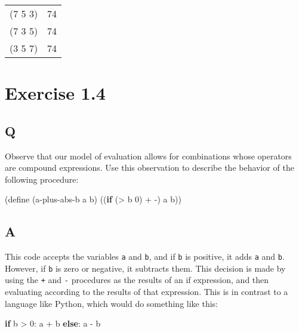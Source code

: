\documentclass[
]{article}
\newenvironment{Shaded}{}{}
\newcommand{\ControlFlowTok}[1]{\textcolor[rgb]{0.00,0.44,0.13}{\textbf{#1}}}
\newcommand{\DecValTok}[1]{\textcolor[rgb]{0.25,0.63,0.44}{#1}}
\newcommand{\ExtensionTok}[1]{#1}
\newcommand{\FunctionTok}[1]{\textcolor[rgb]{0.02,0.16,0.49}{#1}}
\newcommand{\KeywordTok}[1]{\textcolor[rgb]{0.00,0.44,0.13}{\textbf{#1}}}
\newcommand{\NormalTok}[1]{#1}
\newcommand{\OperatorTok}[1]{\textcolor[rgb]{0.40,0.40,0.40}{#1}}
\begin{document}
\begin{longtable}[]{@{}ll@{}}
\toprule
\endhead
(7 5 3) & 74 \\
(7 3 5) & 74 \\
(3 5 7) & 74 \\
\bottomrule
\end{longtable}

\hypertarget{exercise-1.4}{%
\section{Exercise 1.4}\label{exercise-1.4}}

\hypertarget{q-3}{%
\subsection{Q}\label{q-3}}

Observe that our model of evaluation allows for combinations whose
operators are compound expressions. Use this observation to describe the
behavior of the following procedure:

\hypertarget{a-plus-abs-b}{%
\label{a-plus-abs-b}}%
\begin{Shaded}
\begin{Highlighting}[]
\NormalTok{(}\ExtensionTok{define}\FunctionTok{ }\NormalTok{(a{-}plus{-}abs{-}b a b)}
\NormalTok{  ((}\KeywordTok{if}\NormalTok{ (}\OperatorTok{\textgreater{}}\NormalTok{ b }\DecValTok{0}\NormalTok{) }\OperatorTok{+} \OperatorTok{{-}}\NormalTok{) a b))}
\end{Highlighting}
\end{Shaded}

\hypertarget{a-3}{%
\subsection{A}\label{a-3}}

This code accepts the variables \texttt{a} and \texttt{b}, and if
\texttt{b} is positive, it adds \texttt{a} and \texttt{b}. However, if
\texttt{b} is zero or negative, it subtracts them. This decision is made
by using the \texttt{+} and \texttt{-} procedures as the results of an
if expression, and then evaluating according to the results of that
expression. This is in contrast to a language like Python, which would
do something like this:

\begin{Shaded}
\begin{Highlighting}[]
\ControlFlowTok{if}\NormalTok{ b }\OperatorTok{\textgreater{}} \DecValTok{0}\NormalTok{: a }\OperatorTok{+}\NormalTok{ b}
\ControlFlowTok{else}\NormalTok{: a }\OperatorTok{{-}}\NormalTok{ b}
\end{Highlighting}
\end{Shaded}
\end{document}
